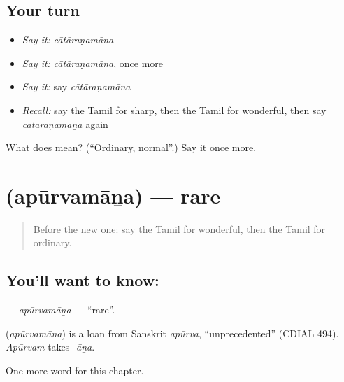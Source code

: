 \subsection*{Your turn}
\begin{itemize}
\raggedright
  \item \emph{Say it:} \emph{cātāraṇamāṉa}
  \item \emph{Say it:} \emph{cātāraṇamāṉa}, once more
  \item \emph{Say it:} say \emph{cātāraṇamāṉa}
  \item \emph{Recall:} say the Tamil for sharp, then the Tamil for wonderful, then say \emph{cātāraṇamāṉa} again
\end{itemize}

\begin{tcolorbox}[breakable,colback=teal!4,colframe=teal!35!black,title={Before you move on}]
What does  mean? (\textquotedblleft{}Ordinary, normal\textquotedblright{}.) Say it once more.
\end{tcolorbox}
\section[\texorpdfstring{\ta{அபூர்வமான} (apūrvamāṉa)}{அபூர்வமான (apūrvamāṉa)}]{ (apūrvamāṉa) — rare}

\label{lesson:TA-C241-apurvamana}



\begin{quote}
Before the new one: say the Tamil for wonderful, then the Tamil for ordinary.
\end{quote}

\subsection*{You'll want to know: }
\textbf{} — \emph{apūrvamāṉa} — \textquotedblleft{}rare\textquotedblright{}.

\begin{cousinweb}
\textbf{} (\emph{apūrvamāṉa}) is a loan from Sanskrit \emph{apūrva}, \textquotedblleft{}unprecedented\textquotedblright{} (CDIAL 494). \emph{Apūrvam} takes \emph{-āṉa}.
\end{cousinweb}

\begin{grammarlens}[title={What you've built}]
One more word for this chapter.
\end{grammarlens}

